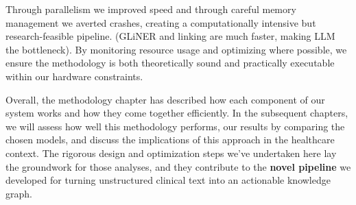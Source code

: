 Through parallelism we improved speed and through careful memory management we averted crashes, creating a computationally intensive but research-feasible pipeline. (GLiNER and linking are much faster, making LLM the bottleneck). By monitoring resource usage and optimizing where possible, we ensure the methodology is both theoretically sound and practically executable within our hardware constraints.

Overall, the methodology chapter has described how each component of our system works and how they come together efficiently. In the subsequent chapters, we will assess how well this methodology performs, our results by comparing the chosen models, and discuss the implications of this approach in the healthcare context. The rigorous design and optimization steps we've undertaken here lay the groundwork for those analyses, and they contribute to the \textbf{novel pipeline} we developed for turning unstructured clinical text into an actionable knowledge graph.